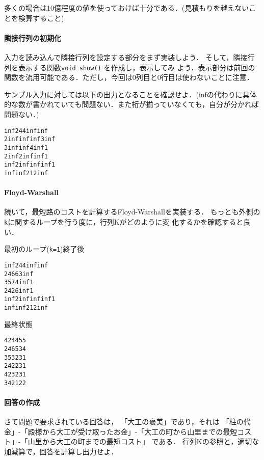 多くの場合は10億程度の値を使っておけば十分である．(見積もりを越えないことを検算すること)

\paragraph{隣接行列の初期化}

入力を読み込んで隣接行列を設定する部分をまず実装しよう．
そして，隣接行列を表示する関数\texttt{void show()} を作成し，表示してみ
よう．表示部分は前回の関数を流用可能である．ただし，今回は0列目と0行目は使わないことに注意．

サンプル入力に対しては以下の出力となることを確認せよ．(infの代わりに具体的な数が書かれていても問題ない．また桁が揃っていなくても，自分が分かれば問題ない．)

\begin{alltt}
  inf    2    4    4  inf  inf
    2  inf  inf  inf    3  inf
    3  inf  inf    4  inf    1
    2  inf    2  inf  inf    1
  inf    2  inf  inf  inf    1
  inf  inf    2    1    2  inf
\end{alltt}

\paragraph{Floyd-Warshall}

続いて，最短路のコストを計算するFloyd-Warshallを実装する．
もっとも外側の\texttt{k}に関するループを行う度に，行列Kがどのように変
化するかを確認すると良い．

最初のループ(\texttt{k=1})終了後
\begin{alltt}
  inf    2    4    4  inf  inf
    2    4    6    6    3  inf
    3    5    7    4  inf    1
    2    4    2    6  inf    1
  inf    2  inf  inf  inf    1
  inf  inf    2    1    2  inf
\end{alltt}

最終状態
\begin{alltt}
    4    2    4    4    5    5
    2    4    6    5    3    4
    3    5    3    2    3    1
    2    4    2    2    3    1
    4    2    3    2    3    1
    3    4    2    1    2    2
\end{alltt}

\paragraph{回答の作成}

さて問題で要求されている回答は，
「大工の褒美」であり，それは
「柱の代金」-「殿様から大工が受け取ったお金」-「大工の町から山里までの最短コスト」-「山里から大工の町までの最短コスト」
である．
行列Kの参照と，適切な加減算で，回答を計算し出力せよ．

